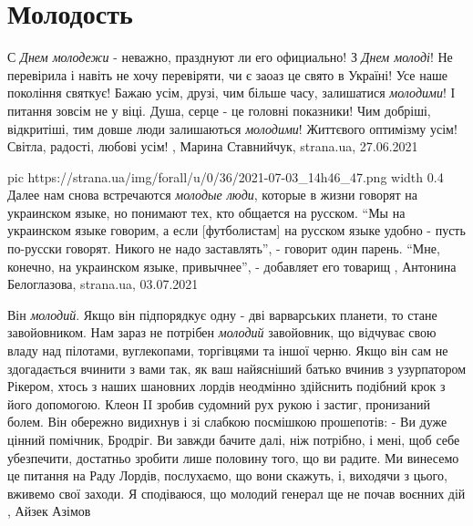  
 
 
 
 
\chapter{Молодость}
\label{sec:slova.molodost}

С \emph{Днем молодежи} - неважно, празднуют ли его официально!  З \emph{Днем молоді}!  Не
перевірила і навіть не хочу перевіряти, чи є заоаз це свято в Україні!  Усе
наше покоління святкує!  Бажаю усім, друзі, чим більше часу, залишатися
\emph{молодими}!  І питання зовсім не у віці.  Душа, серце - це головні показники!
Чим добріші, відкритіші, тим довше люди залишаються \emph{молодими}!  Життєвого
оптимізму усім!  Світла, радості, любові усім!
, 
Марина Ставнийчук, strana.ua, 27.06.2021

\ifcmt
  pic https://strana.ua/img/forall/u/0/36/2021-07-03_14h46_47.png
	width 0.4
\fi
Далее нам снова встречаются \emph{молодые люди}, которые в жизни говорят на
украинском языке, но понимают тех, кто общается на русском. 
\enquote{Мы на украинском языке говорим, а если [футболистам] на русском языке удобно -
пусть по-русски говорят. Никого не надо заставлять}, - говорит один парень. 
\enquote{Мне, конечно, на украинском языке, привычнее}, - добавляет его товарищ
, 
Антонина Белоглазова, strana.ua, 03.07.2021

Він \emph{молодий}. Якщо він підпорядкує одну - дві варварських планети, то стане
завойовником. Нам зараз не потрібен \emph{молодий} завойовник, що відчуває свою владу
над пілотами, вуглекопами, торгівцями та іншої черню. Якщо він сам не
здогадається вчинити з вами так, як ваш найясніший батько вчинив з узурпатором
Рікером, хтось з наших шановних лордів неодмінно здійснить подібний крок з його
допомогою.  Клеон II зробив судомний рух рукою і застиг, пронизаний болем.  Він
обережно видихнув і зі слабкою посмішкою прошепотів: - Ви дуже цінний помічник,
Бродріг. Ви завжди бачите далі, ніж потрібно, і мені, щоб себе убезпечити,
достатньо зробити лише половину того, що ви радите. Ми винесемо це питання на
Раду Лордів, послухаємо, що вони скажуть, і, виходячи з цього, вживемо свої
заходи. Я сподіваюся, що молодий генерал ще не почав воєнних дій
, Айзек Азімов
